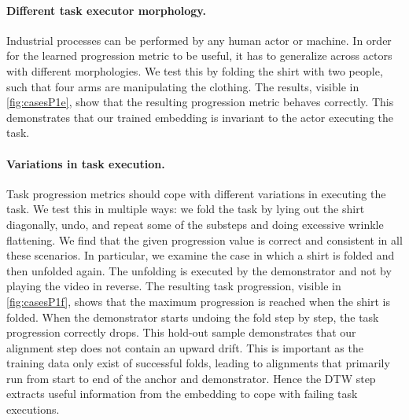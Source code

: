 \documentclass[\home/main.tex]{subfiles}
\begin{document}
\paragraph{Different task executor morphology.}
Industrial processes can be performed by any human actor or machine. In order for the learned progression metric to be useful, it has to generalize across actors with different morphologies. We test this by folding the shirt with two people, such that four arms are manipulating the clothing. The results, visible in \cref{fig:casesP1e}, show that the resulting progression metric behaves correctly. This demonstrates that our trained embedding is invariant to the actor executing the task.

\paragraph{Variations in task execution.}
Task progression metrics should cope with different variations in executing the task. We test this in multiple ways: we fold the task by lying out the shirt diagonally, undo, and repeat some of the substeps and doing excessive wrinkle flattening. We find that the given progression value is correct and consistent in all these scenarios. In particular, we examine the case in which a shirt is folded and then unfolded again. The unfolding is executed by the demonstrator and not by playing the video in reverse. The resulting task progression, visible in \cref{fig:casesP1f}, shows that the maximum progression is reached when the shirt is folded. When the demonstrator starts undoing the fold step by step, the task progression correctly drops. This hold-out sample demonstrates that our alignment step does not contain an upward drift. This is important as the training data only exist of successful folds, leading to alignments that primarily run from start to end of the anchor and demonstrator. Hence the DTW step extracts useful information from the embedding to cope with failing task executions.
\end{document}
